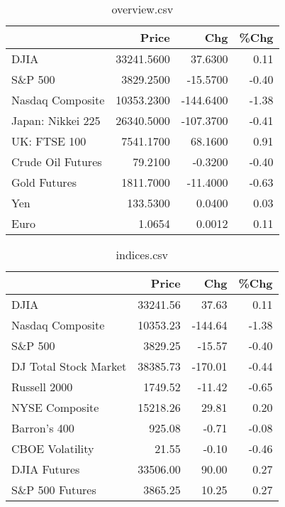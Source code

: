 \documentclass{article}%
\begin{document}
\begin{table}[htbp]%
\caption{overview.csv}%
\centering%
\begin{adjustbox}{width=1\textwidth}%
\begin{tabular}{lrrr}
\toprule
                  &      Price &       Chg &  \%Chg \\
\midrule
             DJIA & 33241.5600 &   37.6300 &  0.11 \\
          S\&P 500 &  3829.2500 &  -15.5700 & -0.40 \\
 Nasdaq Composite & 10353.2300 & -144.6400 & -1.38 \\
Japan: Nikkei 225 & 26340.5000 & -107.3700 & -0.41 \\
     UK: FTSE 100 &  7541.1700 &   68.1600 &  0.91 \\
Crude Oil Futures &    79.2100 &   -0.3200 & -0.40 \\
     Gold Futures &  1811.7000 &  -11.4000 & -0.63 \\
              Yen &   133.5300 &    0.0400 &  0.03 \\
             Euro &     1.0654 &    0.0012 &  0.11 \\
\bottomrule
\end{tabular}
%
\end{adjustbox}%
\end{table}

%


\begin{table}[htbp]%
\caption{indices.csv}%
\centering%
\begin{adjustbox}{width=1\textwidth}%
\begin{tabular}{lrrr}
\toprule
                      &    Price &     Chg &  \%Chg \\
\midrule
                 DJIA & 33241.56 &   37.63 &  0.11 \\
     Nasdaq Composite & 10353.23 & -144.64 & -1.38 \\
              S\&P 500 &  3829.25 &  -15.57 & -0.40 \\
DJ Total Stock Market & 38385.73 & -170.01 & -0.44 \\
         Russell 2000 &  1749.52 &  -11.42 & -0.65 \\
       NYSE Composite & 15218.26 &   29.81 &  0.20 \\
         Barron's 400 &   925.08 &   -0.71 & -0.08 \\
      CBOE Volatility &    21.55 &   -0.10 & -0.46 \\
         DJIA Futures & 33506.00 &   90.00 &  0.27 \\
      S\&P 500 Futures &  3865.25 &   10.25 &  0.27 \\
\bottomrule
\end{tabular}
%
\end{adjustbox}%
\end{table}
\end{document}
